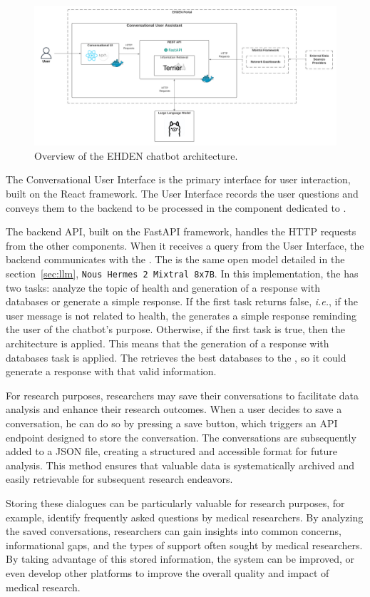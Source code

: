 \begin{figure}[H]
    \includegraphics[width=1\textwidth]{figs/chapter3/architecture.png}
    \centering
    \caption[Overview of the chatbot architecture]{Overview of the EHDEN chatbot architecture.}
    \label{fig_arch}
\end{figure}

The Conversational User Interface is the primary interface for user interaction, built on the React framework. The User Interface records the user questions and conveys them to the backend to be processed in the component dedicated to {\ir}. 

The backend API, built on the FastAPI framework, handles the HTTP requests from the other components. When it receives a query from the User Interface, the backend communicates with the {\llm}. The {\llm} is the same open model detailed in the section~\ref{sec:llm}, \texttt{Nous Hermes 2 Mixtral 8x7B}. In this implementation, the {\llm} has two tasks: analyze the topic of health and generation of a response with databases or generate a simple response. If the first task returns false, \textit{i.e.}, if the user message is not related to health, the {\llm} generates a simple response reminding the user of the chatbot's purpose. Otherwise, if the first task is true, then the {\rag} architecture is applied. This means that the generation of a response with databases task is applied. The {\bm} retrieves the best databases to the {\llm}, so it could generate a response with that valid information.

For research purposes, researchers may save their conversations to facilitate data analysis and enhance their research outcomes. When a user decides to save a conversation, he can do so by pressing a save button, which triggers an API endpoint designed to store the conversation. The conversations are subsequently added to a JSON file, creating a structured and accessible format for future analysis. This method ensures that valuable data is systematically archived and easily retrievable for subsequent research endeavors.

Storing these dialogues can be particularly valuable for research purposes, for example, identify frequently asked questions by medical researchers. By analyzing the saved conversations, researchers can gain insights into common concerns, informational gaps, and the types of support often sought by medical researchers. By taking advantage of this stored information, the system can be improved, or even develop other platforms to improve the overall quality and impact of medical research.
